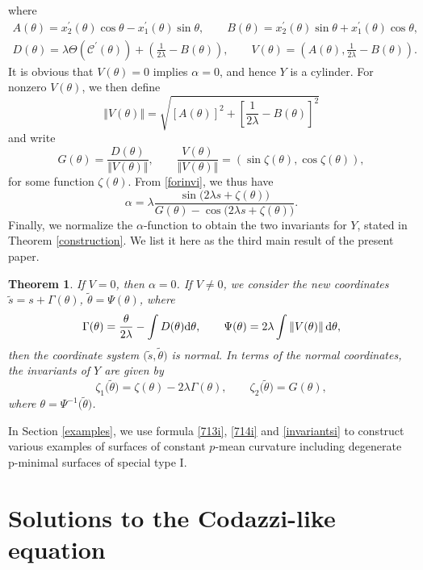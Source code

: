 \documentclass[pdftex]{sigma}
\numberwithin{equation}{section}
\newtheorem{theoremA}{Theorem}
\begin{document}
where
\begin{gather*} %
A(\theta)=x^{\prime }_{2}(\theta)\cos{\theta}-x^{\prime }_{1}(\theta)\sin{\theta},\qquad B(\theta)=x^{\prime }_{2}(\theta)\sin{\theta}+x^{\prime }_{1}(\theta)\cos{\theta}, \\
D(\theta)=\lambda \Theta(\mathcal{C}^{\prime }(\theta))+\left(\frac{1}{2\lambda}-B(\theta)\right),\qquad V(\theta)=\left( A(\theta ),\frac{1}{2\lambda }-B(\theta )\right).
\end{gather*}
It is obvious that $V(\theta )=0$ implies $\alpha=0$, and hence $Y$ is a cylinder. For nonzero $V(\theta )$, we then define
\[\left\Vert V(\theta)\right \Vert =\sqrt{\left[ A( \theta ) \right] ^{2}+
\left[ \frac{1}{2\lambda }-B(\theta )\right] ^{2}}\]
and write
\[
G(\theta )=\frac{D(\theta )}{ \Vert V(\theta) \Vert },\qquad \frac{V(\theta)}{ \Vert V(\theta) \Vert }=(\sin {\zeta (\theta )},\cos {\zeta
(\theta )}),
\]
for some function $\zeta {(\theta )}$.
From \eqref{forinvi}, we thus have
\[\alpha=\lambda \frac{\sin {\bigl(2\lambda s+\zeta {(\theta )}\bigr)}}{G(\theta
)-\cos {\bigl(2\lambda s+\zeta {(\theta )}\bigr)}}.\]
Finally, we normalize the $\alpha$-function to obtain the two invariants for $Y$, stated in Theorem \ref{construction}. We list it here as the third main result of the present paper.

\begin{theoremA}\label{TheoremC}
If $V=0$, then $\alpha=0$. If $V\neq 0$, we consider the new coordinates
$
\tilde{s}=s+\Gamma(\theta)$, $ \tilde{\theta}=\Psi( \theta)$,
where
\[
\Gamma(\theta)=\frac{\theta }{2\lambda}-\int D( \theta){\rm d}\theta,\qquad
\Psi(\theta)=2\lambda \int \left \Vert V(\theta)\right \Vert {\rm d}\theta ,
\]
then the coordinate system $\bigl(\tilde{s},\tilde{\theta}\bigr)$ is normal. In terms of the
normal coordinates, the invariants of $Y$ are given by
\begin{equation}\label{invariantsi}
\zeta _{1}\bigl( \tilde{\theta}\bigr) = \zeta (\theta) -2\lambda \Gamma (\theta), \qquad
\zeta _{2}\bigl( \tilde{\theta}\bigr) = G(\theta),
\end{equation}
where $\theta= \Psi ^{-1}\bigl( \tilde{\theta}\bigr)$.
\end{theoremA}

In Section \ref{examples}, we use formula \eqref{713i}, \eqref{714i} and \eqref{invariantsi} to construct various examples of surfaces of constant $p$-mean curvature including degenerate p-minimal surfaces of special type I.

\section{Solutions to the Codazzi-like equation}
\end{document}
